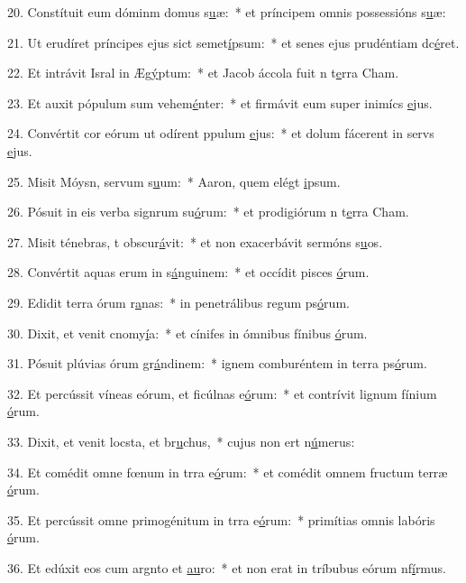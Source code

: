20. Constítuit eum dóminm domus s\uline{u}æ:~* et príncipem omnis possessións s\uline{u}æ:\par 
21. Ut erudíret príncipes ejus sict semet\uline{í}psum:~* et senes ejus prudéntiam dc\uline{é}ret.\par 
22. Et intrávit Isral in Æg\uline{ý}ptum:~* et Jacob áccola fuit n t\uline{e}rra Cham.\par 
23. Et auxit pópulum sum vehem\uline{é}nter:~* et firmávit eum super inimícs \uline{e}jus.\par 
24. Convértit cor eórum ut odírent ppulum \uline{e}jus:~* et dolum fácerent in servs \uline{e}jus.\par 
25. Misit Móysn, servum s\uline{u}um:~* Aaron, quem elégt \uline{i}psum.\par 
26. Pósuit in eis verba signrum su\uline{ó}rum:~* et prodigiórum n t\uline{e}rra Cham.\par 
27. Misit ténebras, t obscur\uline{á}vit:~* et non exacerbávit sermóns s\uline{u}os.\par 
28. Convértit aquas erum in s\uline{á}nguinem:~* et occídit pisces \uline{ó}rum.\par 
29. Edidit terra órum r\uline{a}nas:~* in penetrálibus regum ps\uline{ó}rum.\par 
30. Dixit, et venit cnomy\uline{í}a:~* et cínifes in ómnibus fínibus \uline{ó}rum.\par 
31. Pósuit plúvias órum gr\uline{á}ndinem:~* ignem comburéntem in terra ps\uline{ó}rum.\par 
32. Et percússit víneas eórum, et ficúlnas e\uline{ó}rum:~* et contrívit lignum fínium \uline{ó}rum.\par 
33. Dixit, et venit locsta, et br\uline{u}chus,~* cujus non ert n\uline{ú}merus:\par 
34. Et comédit omne fœnum in trra e\uline{ó}rum:~* et comédit omnem fructum terræ \uline{ó}rum.\par 
35. Et percússit omne primogénitum in trra e\uline{ó}rum:~* primítias omnis labóris \uline{ó}rum.\par 
36. Et edúxit eos cum argnto et \uline{au}ro:~* et non erat in tríbubus eórum nf\uline{í}rmus.\par 
